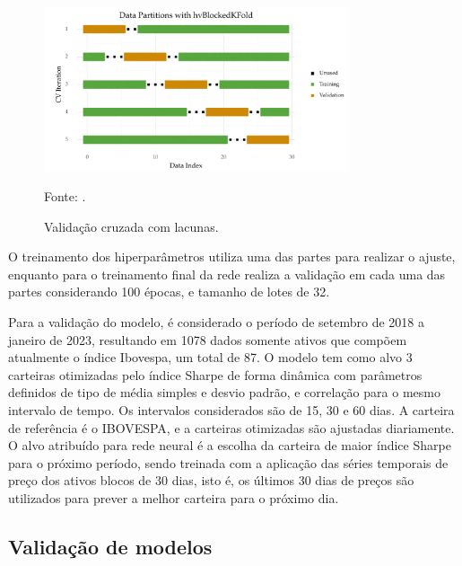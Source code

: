         \begin{figure}[htp]
            \centering
            \caption{Validação cruzada com lacunas.}
            \label{fig:cross_validation}
            \includegraphics[width=0.8\textwidth]{./imagens/cross_validation.png}
            \par \footnotesize Fonte: .
        \end{figure}

        \ipar O treinamento dos hiperparâmetros utiliza uma das partes para realizar o ajuste, enquanto para o treinamento final da rede realiza a validação em cada uma das partes considerando 100 épocas, e tamanho de lotes de 32.

        \ipar Para a validação do modelo, é considerado o período de setembro de 2018 a janeiro de 2023, resultando em 1078 dados somente ativos que compõem atualmente o índice Ibovespa, um total de 87. O modelo tem como alvo 3 carteiras otimizadas pelo índice Sharpe de forma dinâmica com parâmetros definidos de tipo de média simples e desvio padrão, e correlação para o mesmo intervalo de tempo. Os intervalos considerados são de 15, 30 e 60 dias. A carteira de referência é o \acrshort{IBOVESPA}, e a carteiras otimizadas são ajustadas diariamente. O alvo atribuído para rede neural é a escolha da carteira de maior índice Sharpe para o próximo período, sendo treinada com a aplicação das séries temporais de preço dos ativos blocos de 30 dias, isto é, os últimos 30 dias de preços são utilizados para prever a melhor carteira para o próximo dia.

    \subsection{Validação de modelos}

